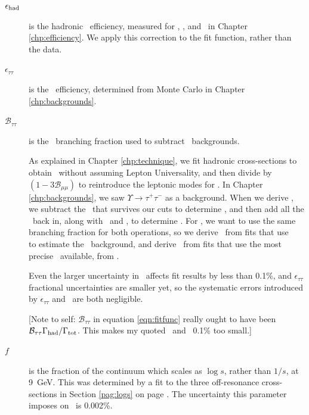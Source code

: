 \documentclass{cornell}
\begin{document}
\begin{description}

  \item[\boldmath $\epsilon_{\mbox{\scriptsize had}}$] is the hadronic \ups\
    efficiency, measured for \us, \uss, and \usss\ in Chapter
    \ref{chp:efficiency}.  We apply this correction to the fit
    function, rather than the data.

  \item[\boldmath $\epsilon_{\tau\tau}$] is the \tautau\ efficiency,
    determined from Monte Carlo in Chapter \ref{chp:backgrounds}.

  \item[\boldmath ${\mathcal B}_{\tau\tau}$] is the \tautau\ branching
    fraction used to subtract \tautau\ backgrounds.

    As explained in Chapter \ref{chp:technique}, we fit hadronic
    cross-sections to obtain \geehadtot\ without assuming Lepton
    Universality, and then divide by $(1-3{\mathcal B}_{\mu\mu})$ to
    reintroduce the leptonic modes for \gee.  In Chapter
    \ref{chp:backgrounds}, we saw $\Upsilon \to \tau^+\tau^-$ as a
    background.  When we derive \gee, we subtract the \tautau\ that
    survives our cuts to determine \geehadtot, and then add all the
    \tautau\ back in, along with \ee\ and \mumu, to determine \gee.
    For \gee, we want to use the same branching fraction for both
    operations, so we derive \gee\ from fits that use \bmm\
    \cite{istvan} to estimate the \tautau\ background, and derive
    \geehadtot\ from fits that use the most precise \btt\ available,
    from \cite{jean}.

    Even the larger uncertainty in \btt\ affects fit results by less
    than 0.1\%, and $\epsilon_{\tau\tau}$ fractional uncertainties are
    smaller yet, so the systematic errors introduced by
    $\epsilon_{\tau\tau}$ and \btt\ are both negligible.

[Note to self: ${\mathcal B}_{\tau\tau}$ in equation \ref{eqn:fitfunc}
really ought to have been ${\mathcal
B}_{\tau\tau}\Gamma_{\mbox{\scriptsize had}}/\Gamma_{\mbox{\scriptsize tot}}$.  This makes my
quoted \geehadtot\ and \gee\ 0.1\% too small.]

  \item[\boldmath $f$] is the fraction of the continuum which scales
    as $\log s$, rather than $1/s$, at 9~GeV.  This was determined by
    a fit to the three off-resonance cross-sections in Section
    \ref{pag:logs} on page \pageref{pag:logs}.  The uncertainty this
    parameter imposes on \geehadtot\ is 0.002\%.

\end{description}
\end{document}
